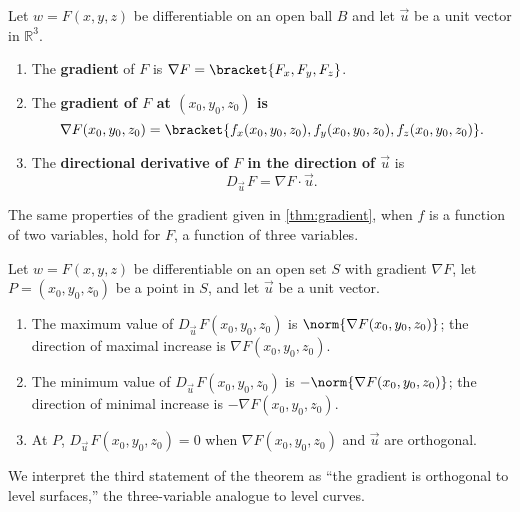 {Let $w=F(x,y,z)$ be differentiable on an open ball $B$ and let $\vec u $ be a unit vector in $\mathbb{R}^3$.
\begin{enumerate}
	\item	The \textbf{gradient} of $F$ is $\nabla F =\bracket{F_x,F_y,F_z}$.
	\item The \textbf{gradient of $F$ at $(x_0,y_0,z_0)$ is
	\[\nabla F(x_0,y_0,z_0) =\bracket{f_x(x_0,y_0,z_0),f_y(x_0,y_0,z_0),f_z(x_0,y_0,z_0)}.\]}
	\item The \textbf{directional derivative of $F$ in the direction of $\vec u$} is
	\[D_{\vec u\,}F=\nabla F\cdot \vec u.\]
\end{enumerate}
}

The same properties of the gradient given in \autoref{thm:gradient}, when $f$ is a function of two variables, hold for $F$, a function of three variables.

{Let $w=F(x,y,z)$ be differentiable on an open set $S$ with gradient $\nabla F$, let $P=(x_0,y_0,z_0)$ be a point in $S$, and let $\vec u$ be a unit vector.
\begin{enumerate}
	\item The maximum value of $D_{\vec u\,}F(x_0,y_0,z_0)$ is $\norm{\nabla F(x_0,y_0,z_0)}$; %
	 the direction of maximal increase is $\nabla F(x_0,y_0,z_0)$.
	\item The minimum value of $D_{\vec u\,}F(x_0,y_0,z_0)$ is $-\norm{\nabla F(x_0,y_0,z_0)}$; %
	 the direction of minimal increase is $-\nabla F(x_0,y_0,z_0)$.
	\item At $P$, $D_{\vec u\,}F(x_0,y_0,z_0) = 0$ when $\nabla F(x_0,y_0,z_0)$ and $\vec u$ are orthogonal.
\end{enumerate}
}

We interpret the third statement of the theorem as ``the gradient is orthogonal to level surfaces,'' the three-variable analogue to level curves.

